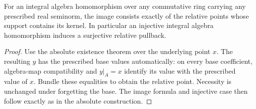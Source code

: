 \begin{corollary}
\label{spectrum:relative-integral-image}
\leanok
\leanok
{}
For an integral algebra homomorphism over any commutative ring carrying
any prescribed real seminorm, the image consists exactly of the relative
points whose support contains its kernel. In particular an injective
integral algebra homomorphism induces a surjective relative pullback.
\end{corollary}
\begin{proof}
Use the absolute existence theorem over the underlying point $x$.
The resulting $y$ has the prescribed base values automatically:
on every base coefficient, algebra-map compatibility and $y|_A=x$
identify its value with the prescribed value of $x$. Bundle these
equalities to obtain the relative point. Necessity is unchanged
under forgetting the base. The image formula and injective case
then follow exactly as in the absolute construction.
\end{proof}
